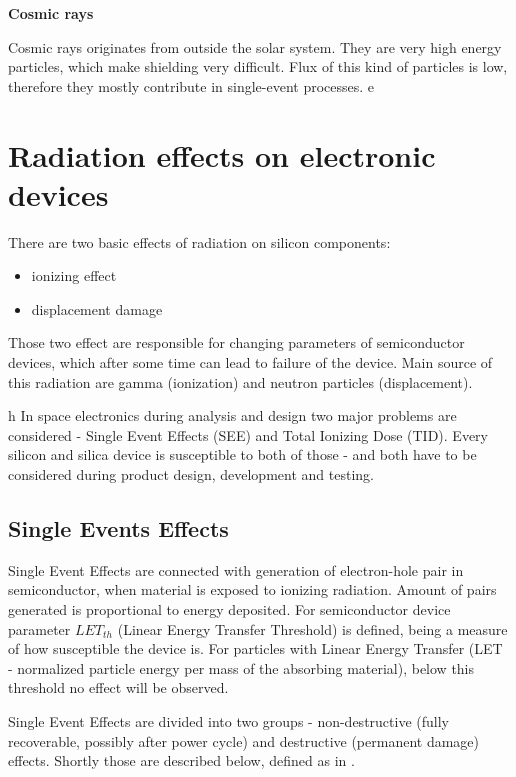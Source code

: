     \bigskip \textbf{Cosmic rays}

    Cosmic rays originates from outside the solar system. They are very high energy particles, which make shielding very difficult. Flux of this kind of particles is low, therefore they mostly contribute in single-event processes.
e
\section{Radiation effects on electronic devices}
    There are two basic effects of radiation on silicon components:
    \begin{itemize}
        \item ionizing effect
        \item displacement damage
    \end{itemize}

    Those two effect are responsible for changing parameters of semiconductor devices, which after some time can lead to failure of the device. Main source of this radiation are gamma (ionization) and neutron particles (displacement).

h    In space electronics during analysis and design two major problems are considered - Single Event Effects (SEE) and Total Ionizing Dose (TID). Every silicon and silica device is susceptible to both of those - and both have to be considered during product design, development and testing.

    \subsection{Single Events Effects}
        Single Event Effects are connected with generation of electron-hole pair in semiconductor, when material is exposed to ionizing radiation. Amount of pairs generated is proportional to energy deposited. For semiconductor device parameter $LET_{th}$ (Linear Energy Transfer Threshold) is defined, being a measure of how susceptible the device is. For particles with Linear Energy Transfer (LET - normalized particle energy per mass of the absorbing material), below this threshold no effect will be observed.

        Single Event Effects are divided into two groups - non-destructive (fully recoverable, possibly after power cycle) and destructive (permanent damage) effects. Shortly those are described below, defined as in \cite{ECSS_Q_ST_60_15C}.

